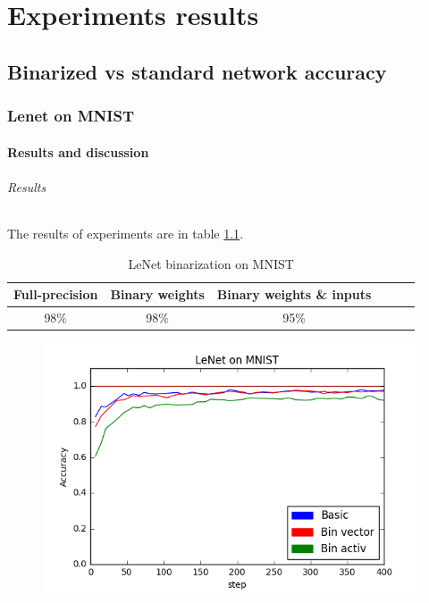\documentclass[licencjacka]{pracamgr}
\begin{document}
	
\part{Experiments results}
\chapter{Binarized vs standard network accuracy}

	\section{Lenet on MNIST}
		\subsection{Results and discussion}
		        \paragraph{Results} 
		     
		        The results of experiments are in table \ref{table:1}.
		        \begin{table}[H]
                    \caption{LeNet binarization on MNIST}
                    \centering
                    \begin{tabular}{c c c c c c}
                    \hline\hline
			    Full-precision & Binary weights & Binary weights \& inputs \\ [0.5ex]
                    \hline
			    98\% & 98\% & 95\% \\
                    \hline
                    \end{tabular}
                    \label{table:1}
	            \end{table}
	            \begin{figure}[h]
				\centering
				\includegraphics[width=\textwidth]{images/LeNet}
			\end{figure}
\end{document}
